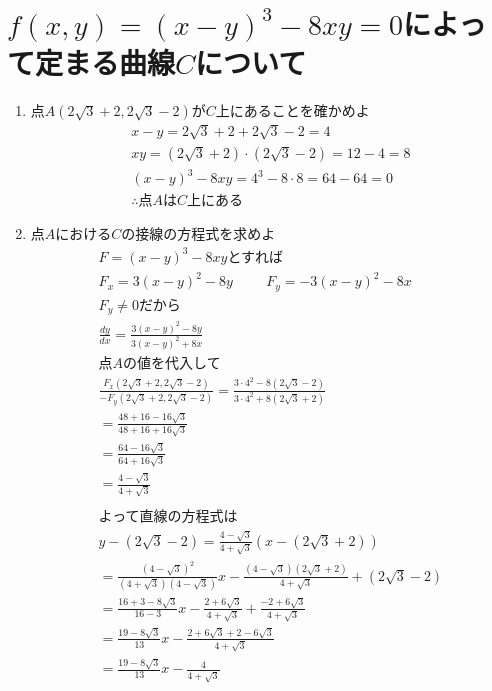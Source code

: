 \documentclass[a4paper,10pt]{jarticle}
\begin{document}
\section{$f(x,y) = (x-y)^3-8xy=0$によって定まる曲線$C$について}
\begin{enumerate}
\item 点$A(2\sqrt{3}+2,2\sqrt{3}-2)$が$C$上にあることを確かめよ\begin{gather*}
	x-y=2\sqrt{3}+2 + 2\sqrt{3}-2 = 4\\
	xy = (2\sqrt{3}+2) \cdot (2\sqrt{3}-2) = 12 - 4 = 8\\
	(x-y)^3-8xy = 4^3 - 8 \cdot 8 = 64 - 64 = 0 \\
	\therefore \text{点}A\text{は}C\text{上にある}
\end{gather*}
\item 点$A$における$C$の接線の方程式を求めよ\begin{gather*}
	F = (x-y)^3-8xy\text{とすれば}\\
	F_x = 3(x-y)^2-8y \hspace{1cm} F_y= -3(x-y)^2-8x \\
	F_y \neq 0 \text{だから} \\
	\frac{dy}{dx} = \frac{3(x-y)^2-8y}{3(x-y)^2+8x}\\
	\text{点$A$の値を代入して} \\
	\frac{F_x(2\sqrt{3}+2,2\sqrt{3}-2)}{-F_y(2\sqrt{3}+2,2\sqrt{3}-2)}
		=\frac{3 \cdot 4^2 - 8(2\sqrt{3}-2)}{3 \cdot 4^2 + 8(2\sqrt{3}+2)} \\
	=\frac{48+16-16\sqrt{3}}{48+16+16\sqrt{3}} \\
	=\frac{64-16\sqrt{3}}{64+16\sqrt{3}} \\
	=\frac{4-\sqrt{3}}{4+\sqrt{3}}\\\\
	\text{よって直線の方程式は}\\
	y - (2\sqrt{3}-2) = \frac{4-\sqrt{3}}{4+\sqrt{3}} (x - (2\sqrt{3}+2))\\
	= \frac{(4-\sqrt{3})^2}{(4+\sqrt{3})(4-\sqrt{3})}x-\frac{(4-\sqrt{3})(2\sqrt{3}+2)}{4+\sqrt{3}}+(2\sqrt{3}-2)\\
	= \frac{16+3-8\sqrt{3}}{16-3}x-\frac{2+6\sqrt{3}}{4+\sqrt{3}}+\frac{-2+6\sqrt{3}}{4+\sqrt{3}}\\
	=\frac{19-8\sqrt{3}}{13}x-\frac{2+6\sqrt{3}+2-6\sqrt{3}}{4+\sqrt{3}}\\
	=\frac{19-8\sqrt{3}}{13}x-\frac{4}{4+\sqrt{3}}
\end{gather*}
\end{enumerate}
\end{document}
